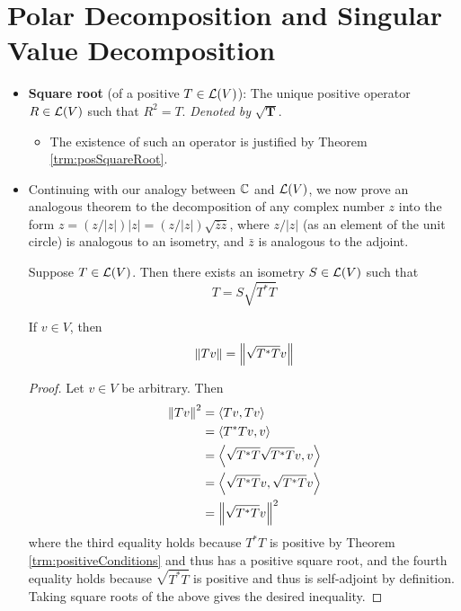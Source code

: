\documentclass[../main.tex]{subfiles}
\begin{document}
\section{Polar Decomposition and Singular Value Decomposition}
\begin{itemize}
    \item {}\textbf{Square root} (of a positive $T\in\mathcal{L}(V)$): The unique positive operator $R\in\mathcal{L}(V)$ such that $R^2=T$. \emph{Denoted by} $\bm{\sqrt{T}}$.
    \begin{itemize}
        \item The existence of such an operator is justified by Theorem \ref{trm:posSquareRoot}.
    \end{itemize}
    \item {}Continuing with our analogy between $\mathbb{C}$ and $\mathcal{L}(V)$, we now prove an analogous theorem to the decomposition of any complex number $z$ into the form $z=(z/|z|)|z|=(z/|z|)\sqrt{\bar{z}z}$, where $z/|z|$ (as an element of the unit circle) is analogous to an isometry, and $\bar{z}$ is analogous to the adjoint.
    \begin{theorem}\label{trm:polarDecomp}
        Suppose $T\in\mathcal{L}(V)$. Then there exists an isometry $S\in\mathcal{L}(V)$ such that
        \begin{equation*}
            T = S\sqrt{T^*T}
        \end{equation*}
        \begin{lemma*}\label{lem:normTroot}
            If $v\in V$, then
            \begin{equation*}
                \norm{Tv} = \norm{\sqrt{T^*T}v}
            \end{equation*}
            \begin{proof}
                Let $v\in V$ be arbitrary. Then
                \begin{align*}
                    \norm{Tv}^2 &= \left\langle{Tv},{Tv}\right\rangle\\
                    &= \left\langle{T^*Tv},{v}\right\rangle\\
                    &= \left\langle{\sqrt{T^*T}\sqrt{T^*T}v},{v}\right\rangle\\
                    &= \left\langle{\sqrt{T^*T}v},{\sqrt{T^*T}v}\right\rangle\\
                    &= \norm{\sqrt{T^*T}v}^2
                \end{align*}
                where the third equality holds because $T^*T$ is positive by Theorem \ref{trm:positiveConditions} and thus has a positive square root, and the fourth equality holds because $\sqrt{T^*T}$ is positive and thus is self-adjoint by definition. Taking square roots of the above gives the desired inequality.

\end{proof}
\end{lemma*}
\end{theorem}
\end{itemize}
\end{document}

